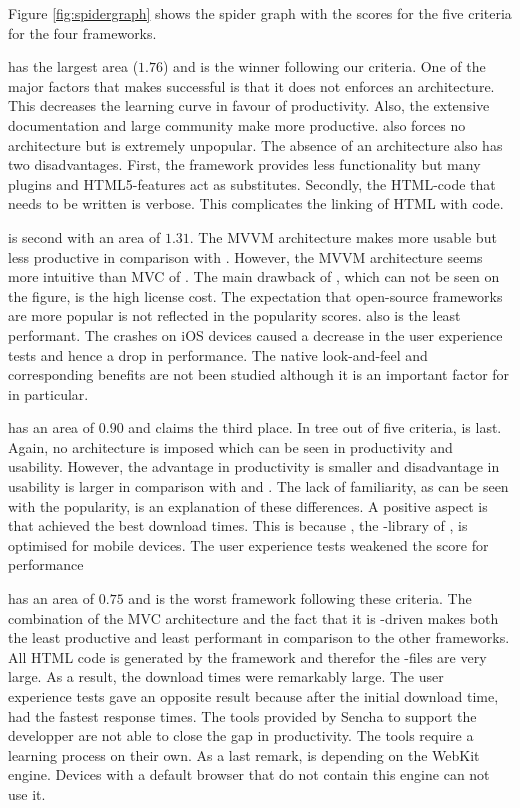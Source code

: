 \documentclass[a4paper]{artikel3}
\begin{document}
Figure \ref{fig:spidergraph} shows the spider graph with the scores for the five criteria for the four frameworks.

\jqma{} has the largest area ($1.76$) and is the winner following our criteria.
One of the major factors that makes \jqma{} successful is that it does not enforces an architecture.
This decreases the learning curve in favour of productivity.
Also,  the extensive documentation and large community make \jqma{} more productive.
\lungo{} also forces no architecture but is extremely unpopular.
The absence of 	an architecture also has two disadvantages.
First,  the framework provides less functionality but many plugins and HTML5-features act as substitutes.
Secondly,  the HTML-code that needs to be written is verbose.
This complicates the linking of HTML with \js{} code.

\kendoa{} is second with an area of $1.31$.
The MVVM architecture makes \kendoa{} more usable but less productive in comparison with \jqma{}.
However,  the MVVM architecture seems more intuitive than MVC of \sta{}.
The main drawback of \kendoa{},  which can not be seen on the figure, is the high license cost.
The expectation that open-source frameworks are more popular is not reflected in the popularity scores.
\kendoa{} also is the least performant.
The crashes on iOS devices caused a decrease in the user experience tests and hence a drop in performance.
The native look-and-feel and corresponding benefits are not been studied although it is an important factor for \kendoa{} in particular.

\lungo{} has an area of $0.90$ and claims the third place.
In tree out of five criteria,  \lungo{} is last.
Again, no architecture is imposed which can be seen in productivity and usability.
However,  the advantage in productivity is smaller and disadvantage in usability is larger in comparison with \sta{} and \kendoa{}.
The lack of familiarity,  as can be seen with the popularity,  is an explanation of these differences.
A positive aspect is that \lungo{} achieved the best download times.  
This is because \quo{},  the \js-library of \lungo{},  is optimised for mobile devices.
The user experience tests weakened the score for performance


\sta {} has an area of $0.75$ and is the worst framework following these criteria.
The combination of the MVC architecture and the fact that it is \js-driven makes \sta{} both the least productive and least performant in comparison to the other frameworks.
All HTML code is generated by the framework and therefor the \js-files are very large.
As a result,  the download times were remarkably large.
The user experience tests gave an opposite result because after the initial download time,  \sta{} had the fastest response times.
The tools provided by Sencha to support the developper are not able to close the gap in productivity.
The tools require a learning process on their own.
As a last remark,  \sta{} is depending on the WebKit engine.
Devices with a default browser that do not contain this engine can not use it.
\end{document}
